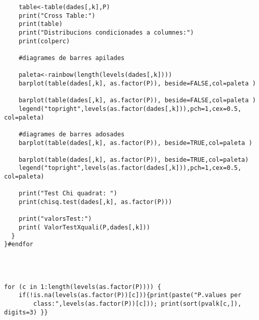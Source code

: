 \begin{verbatim}
    table<-table(dades[,k],P)
    print("Cross Table:")
    print(table)
    print("Distribucions condicionades a columnes:")
    print(colperc)
    
    #diagrames de barres apilades                                         
    
    paleta<-rainbow(length(levels(dades[,k])))
    barplot(table(dades[,k], as.factor(P)), beside=FALSE,col=paleta )
    
    barplot(table(dades[,k], as.factor(P)), beside=FALSE,col=paleta )
    legend("topright",levels(as.factor(dades[,k])),pch=1,cex=0.5, col=paleta)
    
    #diagrames de barres adosades
    barplot(table(dades[,k], as.factor(P)), beside=TRUE,col=paleta )
    
    barplot(table(dades[,k], as.factor(P)), beside=TRUE,col=paleta)
    legend("topright",levels(as.factor(dades[,k])),pch=1,cex=0.5, col=paleta)
    
    print("Test Chi quadrat: ")
    print(chisq.test(dades[,k], as.factor(P)))
    
    print("valorsTest:")
    print( ValorTestXquali(P,dades[,k]))
  }
}#endfor




for (c in 1:length(levels(as.factor(P)))) { 
    if(!is.na(levels(as.factor(P))[c])){print(paste("P.values per 
        class:",levels(as.factor(P))[c])); print(sort(pvalk[c,]), digits=3) }}



\end{verbatim}


